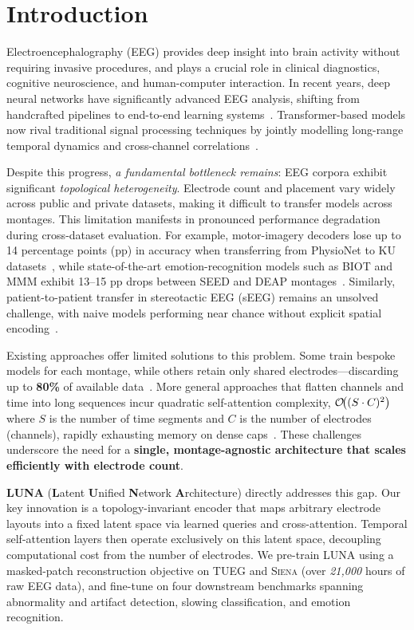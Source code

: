 \section{Introduction}
\label{sec:introduction}
Electroencephalography (EEG) provides deep insight into brain activity without requiring invasive procedures, and plays a crucial role in clinical diagnostics, cognitive neuroscience, and human-computer interaction. In recent years, deep neural networks have significantly advanced EEG analysis, shifting from handcrafted pipelines to end-to-end learning systems~\cite{craik2019deep}. Transformer-based models now rival traditional signal processing techniques by jointly modelling long-range temporal dynamics and cross-channel correlations~\cite{song2022eeg,wen2022transformers}. 

Despite this progress, \emph{a fundamental bottleneck remains}: EEG corpora exhibit significant \emph{topological heterogeneity}. Electrode count and placement vary widely across public and private datasets, making it difficult to transfer models across montages. This limitation manifests in pronounced performance degradation during cross-dataset evaluation. For example, motor-imagery decoders lose up to 14 percentage points (pp) in accuracy when transferring from PhysioNet to KU datasets~\cite{xu2020cross}, while state-of-the-art emotion-recognition models such as BIOT and MMM exhibit 13–15 pp drops between SEED and DEAP montages~\cite{yang2023biot,yi2023learning}. Similarly, patient-to-patient transfer in stereotactic EEG (sEEG) remains an unsolved challenge, with naive models performing near chance without explicit spatial encoding~\cite{mentzelopoulos2024neural}. 

Existing approaches offer limited solutions to this problem. Some train bespoke models for each montage, while others retain only shared electrodes---discarding up to \textbf{80\%} of available data~\cite{lin2023eeg}. More general approaches that flatten channels and time into long sequences incur quadratic self-attention complexity, \(\mathcal{O}\!\bigl((S \cdot C)^{2}\bigr)\) where $S$ is the number of time segments and $C$ is the number of electrodes (channels), rapidly exhausting memory on dense caps~\cite{yang2023biot}. These challenges underscore the need for a \textbf{single, montage-agnostic architecture that scales efficiently with electrode count}.

\textbf{LUNA} (\textbf{L}atent \textbf{U}nified \textbf{N}etwork \textbf{A}rchitecture) directly addresses this gap. Our key innovation is a topology-invariant encoder that maps arbitrary electrode layouts into a fixed latent space via learned queries and cross-attention. Temporal self-attention layers then operate exclusively on this latent space, decoupling computational cost from the number of electrodes. We pre-train LUNA using a masked-patch reconstruction objective on \textsc{TUEG} \cite{obeid2016temple} and \textsc{Siena} \cite{detti2020siena} (over \textit{21,000} hours of raw EEG data), and fine-tune on four downstream benchmarks spanning abnormality and artifact detection, slowing classification, and emotion recognition.

